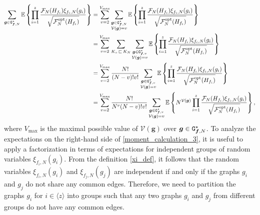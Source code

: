 \documentclass[11pt,reqno]{amsart}
\numberwithin{equation}{section}
\newcommand{\sprod}[1]{\langle#1\rangle}
\newcommand{\E}[1]{\mathbb{E}\left\{ #1\right\}}
\newcommand{\kb}[1]{\boldsymbol{#1}}
\newcommand{\vk}[1]{\kb{#1}}
\begin{document}
\begin{align}
     \sum_{\vk g\in{\tt G}^{\star}_{\vk f,N}}\E{\prod_{i=1}^{z}\frac{\mathcal{F}_{{N}}({H}_{f_i})\xi_{f_i,{N}}(g_i)}{\sqrt{\mathcal{F}^{\rm opt}_N({H}_{f_i})}}} &= \sum_{{v=2}}^{V_{\max}}\sum_{\substack{\vk g\in{\tt G}^{\star}_{\vk f,N}\\ \mathcal{V}\left(\vk g\right) = v }}\E{\prod_{i=1}^{z}\frac{\mathcal{F}_{{N}}({H}_{f_i})\xi_{f_i,{N}}(g_i)}{\sqrt{\mathcal{F}^{\rm opt}_N({H}_{f_i})}}}\notag\\
     &= \sum_{{v=2}}^{V_{\max}}\sum_{K_v{\,\sqsubset\,} K_N}\sum_{\substack{\vk g\in{\tt G}^{\star}_{\vk f,v}\\
     \mathcal{V}\left(\vk g\right) = v }}\E{\prod_{i=1}^{z}\frac{\mathcal{F}_{{N}}({H}_{f_i})\xi_{f_i,{N}}(g_i)}{\sqrt{\mathcal{F}^{\rm opt}_N({H}_{f_i})}}}\notag\\
     &= \sum_{{v=2}}^{V_{\max}}\frac{N!}{(N-v)!v!}\sum_{\substack{\vk g\in{\tt G}^{\star}_{\vk f,v}\\
     \mathcal{V}\left(\vk g\right) = v }}\E{\prod_{i=1}^{z}\frac{\mathcal{F}_{{N}}({H}_{f_i})\xi_{f_i,{N}}(g_i)}{\sqrt{\mathcal{F}^{\rm opt}_N({H}_{f_i})}}}\notag\\
     &= \sum_{{v=2}}^{V_{\max}}\frac{N!}{N^{v}(N-v)!v!}\sum_{\substack{\vk g\in{\tt G}^{\star}_{\vk f,v}\\
     \mathcal{V}\left(\vk g\right) = v }}\E{N^{\mathcal{V}(\vk{g})}\prod_{i=1}^{z}\frac{\mathcal{F}_{{N}}({H}_{f_i})\xi_{f_i,{N}}(g_i)}{\sqrt{\mathcal{F}^{\rm opt}_N({H}_{f_i})}}},\label{moment_calculation_3}
\end{align}
 where $V_{\max}$ is the maximal possible value of $\mathcal{V}\left(\vk g\right)$ over $\vk g\in{\tt G}^{\star}_{\vk f,N}$. 
{To analyze the expectations on the right-hand side of \eqref{moment_calculation_3}, it is useful to apply a factorization in terms of expectations for independent groups of random variables $\xi_{f_i,N}(g_i)$. From the definition \eqref{xi_def}, it follows that the random variables $\xi_{f_i,N}(g_i)$ and $\xi_{f_j,N}(g_j)$ are independent if and only if the graphs $g_i$ and $g_j$ do not share any common edges. Therefore, we need to partition the graphs $g_i$ for $i \in \sprod{z}$ into groups such that any two graphs $g_i$ and $g_j$ from different groups do not have any common edges.}
\end{document}
